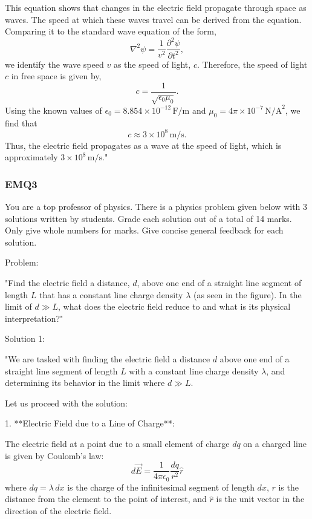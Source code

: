 This equation shows that changes in the electric field propagate through space as waves. The speed at which these waves travel can be derived from the equation. Comparing it to the standard wave equation of the form,
\[
\nabla^2 \psi = \frac{1}{v^2} \frac{\partial^2 \psi}{\partial t^2},
\]
we identify the wave speed $v$ as the speed of light, $c$. Therefore, the speed of light $c$ in free space is given by,
\[
c = \frac{1}{\sqrt{\epsilon_0 \mu_0}}.
\]
Using the known values of $\epsilon_0 = 8.854 \times 10^{-12} \, \text{F/m}$ and $\mu_0 = 4\pi \times 10^{-7} \, \text{N/A}^2$, we find that
\[
c \approx 3 \times 10^8 \, \text{m/s}.
\]
Thus, the electric field propagates as a wave at the speed of light, which is approximately $3 \times 10^8 \, \text{m/s}$."

\subsubsection{EMQ3}

You are a top professor of physics. There is a physics problem given below with 3 solutions written by students. Grade each solution out of a total of 14 marks. Only give whole numbers for marks. Give concise general feedback for each solution. 

Problem:

"Find the electric field a distance, \( d \), above one end of a straight line segment of length \( L \) that has a constant line charge density \( \lambda \) (as seen in the figure). In the limit of \( d \gg L \), what does the electric field reduce to and what is its physical interpretation?"

Solution 1:

"We are tasked with finding the electric field a distance \( d \) above one end of a straight line segment of length \( L \) with a constant line charge density \( \lambda \), and determining its behavior in the limit where \( d \gg L \).

Let us proceed with the solution:

1. **Electric Field due to a Line of Charge**: 

The electric field at a point due to a small element of charge \( dq \) on a charged line is given by Coulomb's law:
\[
d\vec{E} = \frac{1}{4 \pi \epsilon_0} \frac{dq}{r^2} \hat{r}
\]
where \( dq = \lambda \, dx \) is the charge of the infinitesimal segment of length \( dx \), \( r \) is the distance from the element to the point of interest, and \( \hat{r} \) is the unit vector in the direction of the electric field.

